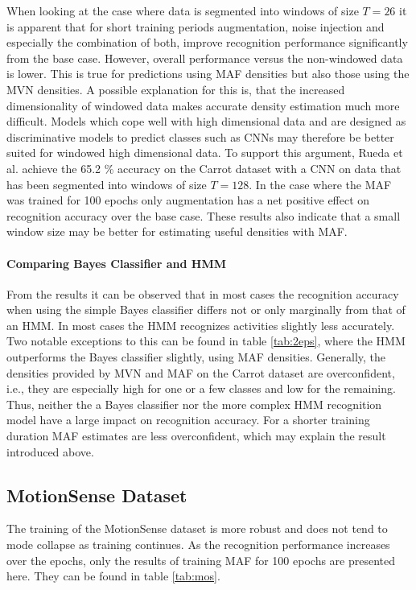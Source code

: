 \documentclass[11pt,titlepage,oneside,openany]{book}
\begin{document}
When looking at the case where data is segmented into windows of size $T=26$ it is apparent that for short training periods augmentation, noise injection and especially the combination of both, improve recognition performance significantly from the base case. However, overall performance versus the non-windowed data is lower. This is true for predictions using MAF densities but also those using the MVN densities. A possible explanation for this is, that the increased dimensionality of windowed data makes accurate density estimation much more difficult. Models which cope well with high dimensional data and are designed as discriminative models to predict classes such as CNNs may therefore be better suited for windowed high dimensional data. To support this argument, Rueda et al. \cite{rueda_combining_2019} achieve the 65.2 \% accuracy on the Carrot dataset with a CNN on data that has been segmented into windows of size $T=128$. In the case where the MAF was trained for 100 epochs only augmentation has a net positive effect on recognition accuracy over the base case. These results also indicate that a small window size may be better for estimating useful densities with MAF.

\paragraph{Comparing Bayes Classifier and HMM}
From the results it can be observed that in most cases the recognition accuracy when using the simple Bayes classifier differs not or only marginally from that of an HMM. In most cases the HMM recognizes activities slightly less accurately. Two notable exceptions to this can be found in table \ref{tab:2eps}, where the HMM outperforms the Bayes classifier slightly, using MAF densities. Generally, the densities provided by MVN and MAF on the Carrot dataset are overconfident, i.e., they are especially high for one or a few classes and low for the remaining. Thus, neither the a Bayes classifier nor the more complex HMM recognition model have a large impact on recognition accuracy. For a shorter training duration MAF estimates are less overconfident, which may explain the result introduced above.

\subsection{MotionSense Dataset}
The training of the MotionSense dataset is more robust and does not tend to mode collapse as training continues. As the recognition performance increases over the epochs, only the results of training MAF for 100 epochs are presented here. They can be found in table \ref{tab:mos}.
\end{document}
